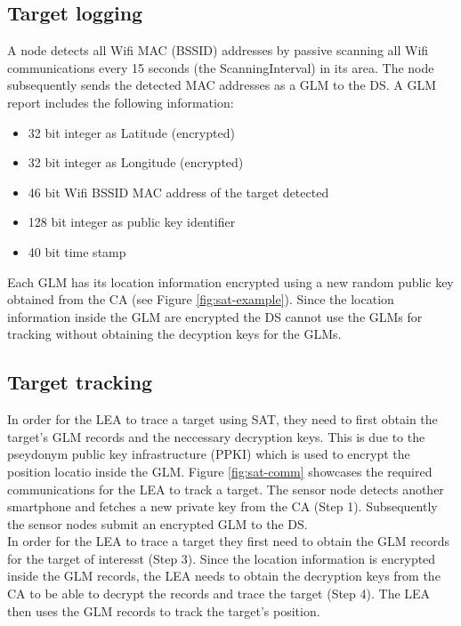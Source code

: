 \documentclass[10pt,titlepage]{article}
\begin{document}
\subsection{Target logging}
A node detects all Wifi MAC (BSSID) addresses by passive scanning all Wifi communications every 15 seconds (the ScanningInterval) in its area. The node subsequently sends the detected MAC addresses as a GLM to the DS. A GLM report includes the following information:
\vspace{0.25cm}

\begin{itemize}
 \item 32 bit integer as Latitude (encrypted)
 \item 32 bit integer as Longitude (encrypted)
 \item 46 bit Wifi BSSID MAC address of the target detected
 \item 128 bit integer as public key identifier
 \item 40 bit time stamp
\end{itemize}

\vspace{0.5cm}
Each GLM has its location information encrypted using a new random public key obtained from the CA (see Figure \ref{fig:sat-example}). Since the location information inside the GLM are encrypted the DS cannot use the GLMs for tracking without obtaining the decyption keys for the GLMs.


\subsection{Target tracking}
In order for the LEA to trace a target using SAT, they need to first obtain the target's GLM records and the neccessary decryption keys. This is due to the pseydonym public key infrastructure (PPKI) which is used to encrypt the position locatio inside the GLM. Figure \ref{fig:sat-comm} showcases the required communications for the LEA to track a target. The sensor node detects  another smartphone and fetches a new private key from the CA (Step 1). Subsequently the sensor nodes submit an encrypted GLM to the DS.\\

In order for the LEA to trace a target they first need to obtain the GLM records for the target of interesst (Step 3). Since the location information is encrypted inside the GLM records, the LEA needs to obtain the decryption keys from the CA to be able to decrypt the records and trace the target (Step 4). The LEA then uses the GLM records to track the target's position.\\
\end{document}
